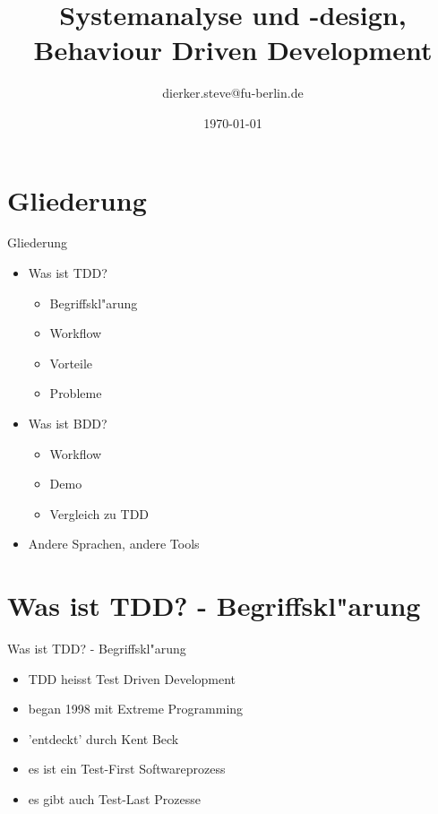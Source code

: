 \documentclass{beamer}
\title{Systemanalyse und -design, Behaviour Driven Development}
\author[Steve Dierker]{dierker.steve@fu-berlin.de}
\date{\today}
\begin{document}
\frame{\titlepage}

\section{Gliederung}
  \begin{frame}{Gliederung}
    \begin{itemize}
      \item Was ist TDD?
      \begin{itemize}
        \item Begriffskl"arung
        \item Workflow
        \item Vorteile
        \item Probleme
      \end{itemize}
      \item Was ist BDD? 
      \begin{itemize}
        \item Workflow
        \item Demo
        \item Vergleich zu TDD
      \end{itemize}
      \item Andere Sprachen, andere Tools
    \end{itemize}
  \end{frame}

\section{Was ist TDD? - Begriffskl"arung}
  \begin{frame}{Was ist TDD? - Begriffskl"arung}
    \begin{itemize}
      \item TDD heisst Test Driven Development
      \item began 1998 mit Extreme Programming
      \item 'entdeckt' durch Kent Beck
      \item es ist ein Test-First Softwareprozess
      \item es gibt auch Test-Last Prozesse
    \end{itemize}
  \end{frame}
\end{document}

